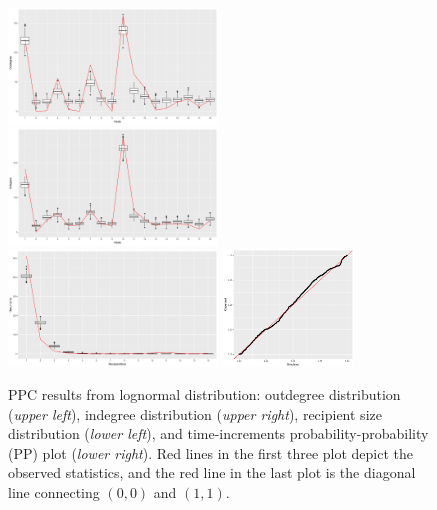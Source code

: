 \documentclass[ba]{imsart}
\numberwithin{equation}{section}
\theoremstyle{plain}
\begin{document}
	\begin{figure}[!t]
		\centering
		\includegraphics[width=0.495\textwidth]{img/outdegreenew-1.png}	
		\includegraphics[width=0.495\textwidth]{img/indegreenew-1.png}	
		\includegraphics[width=0.495\textwidth]{img/recipientsizenew-1.png}	
		\includegraphics[width=0.31\textwidth]{img/timeppnew.pdf}
		\caption {PPC results from lognormal distribution: outdegree distribution (\textit{upper left}), indegree distribution (\textit{upper right}), recipient size distribution (\textit{lower left}), and time-increments probability-probability (PP) plot  (\textit{lower right}). Red lines in the first three plot depict the observed statistics, and the red line in the last plot is the diagonal line connecting $(0, 0)$ and $(1, 1)$.}
		\label{figure:PPCresults}
	\end{figure}
	
\end{document}
